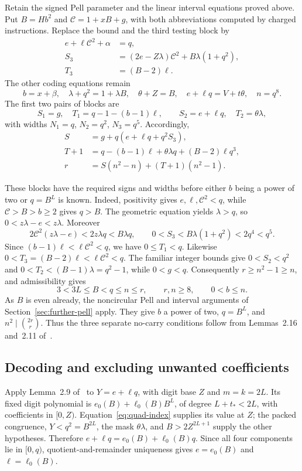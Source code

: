 Retain the signed Pell parameter and the linear interval equations
proved above. Put $B=Hb^2$ and $\mathcal C=1+xB+g$, with both
abbreviations computed by charged instructions. Replace the bound and
the third testing block by
\begin{align*}
 e+\ell\mathcal C^2+\alpha&=q,\\
 S_3&=(2e-Z\lambda)\mathcal C^2+B\lambda(1+q^2),\\
 T_3&=(B-2)\ell.
\end{align*}
The other coding equations remain
\[
 b=x+\beta,\quad \lambda+q^2=1+\lambda B,\quad
 \theta+Z=B,\quad e+\ell q=V+t\theta,\quad n=q^8.
\]
The first two pairs of blocks are
\[
 S_1=g,\quad T_1=q-1-(b-1)\ell,\qquad
 S_2=e+\ell q,\quad T_2=\theta\lambda,
\]
with widths $N_1=q$, $N_2=q^2$, $N_3=q^5$. Accordingly,
\begin{align*}
 S&=g+q(e+\ell q+q^2S_3),\\
 T+1&=q-(b-1)\ell+\theta\lambda q+(B-2)\ell q^3,\\
 r&=S(n^2-n)+(T+1)(n^2-1).
\end{align*}

These blocks have the required signs and widths before either
$b$ being a power of two or $q=B^L$ is known. Indeed, positivity gives
$e,\ell,\mathcal C^2<q$, while $\mathcal C>B>b\ge2$ gives $q>B$.
The geometric equation yields $\lambda>q$, so
$0<z\lambda-e<z\lambda$. Moreover
\[
 2\mathcal C^2(z\lambda-e)<2z\lambda q<B\lambda q,
 \qquad 0<S_3<B\lambda(1+q^2)<2q^4<q^5.
\]
Since $(b-1)\ell<\ell\mathcal C^2<q$, we have $0\le T_1<q$.
Likewise $0<T_3=(B-2)\ell<\ell\mathcal C^2<q$.
The familiar integer bounds give $0<S_2<q^2$ and
$0<T_2<(B-1)\lambda=q^2-1$, while $0<g<q$.
Consequently $r\ge n^2-1\ge n$, and admissibility gives
\[
 3<3L\le B<q\le n\le r,
 \qquad r,n\ge8,\qquad 0<b\le n.
\]
As $B$ is even already, the noncircular Pell and interval arguments of
Section~\ref{sec:further-pell} apply. They give $b$ a power of two,
$q=B^L$, and $n^2\mid\binom{2r}{r}$. Thus the three separate no-carry
conditions follow from Lemmas~2.16 and~2.11 of~\cite{J82}.

\subsection{Decoding and excluding unwanted coefficients}

Apply Lemma~2.9 of~\cite{J82} to $Y=e+\ell q$, with digit base $Z$
and $m=k=2L$. Its fixed digit polynomial is
$e_0(B)+\ell_0(B)B^L$, of degree $L+t_*<2L$, with coefficients
in $[0,Z)$. Equation~\eqref{eq:quad-index} supplies its value at $Z$;
the packed congruence, $Y<q^2=B^{2L}$, the mask $\theta\lambda$, and
$B>2Z^{2L+1}$ supply the other hypotheses. Therefore
$e+\ell q=e_0(B)+\ell_0(B)q$. Since all four components lie in
$[0,q)$, quotient-and-remainder uniqueness gives
$e=e_0(B)$ and $\ell=\ell_0(B)$.

